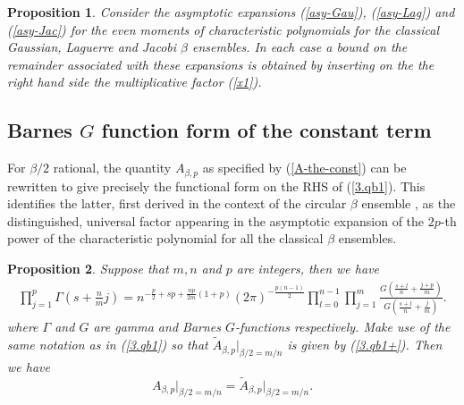\documentclass[11pt,a4paper]{article}
\numberwithin{equation}{section} %
\theoremstyle{plain}
\newtheorem{prop}{Proposition}
\theoremstyle{definition}
\numberwithin{prop}{section}
\numberwithin{cor}{section}
\numberwithin{remark}{section}
\begin{document}
\begin{prop}\label{P2.1}
Consider the asymptotic expansions
(\ref{asy-Gau}), (\ref{asy-Lag}) and 
(\ref{asy-Jac}) for the even moments of characteristic polynomials for the classical Gaussian, Laguerre and Jacobi 
$\beta$ ensembles. In each case a bound on the remainder associated with these expansions is obtained by inserting on the the right hand side the multiplicative factor (\ref{x1}).

\end{prop}



\subsection{Barnes $G$ function form of the constant term}
For $\beta/2$ rational, the quantity $A_{\beta,p}$ as specified by (\ref{A-the-const}) can be
rewritten to give precisely the functional form on the RHS of (\ref{3.qb1}). This
identifies the latter, first derived in the context of the circular $\beta$ ensemble
\cite{Fo92j}, as the distinguished, universal factor appearing in the asymptotic expansion of
the $2p$-th power of the characteristic polynomial for all the classical $\beta$ ensembles.


\begin{prop}\label{G-gam-eq}
    Suppose that $m,n$ and $p$ are integers, then we have
\begin{align}\label{1.18}
    \prod_{j=1}^{p}\Gamma\left(s+\frac{n}{m}j\right)=n^{-\frac{p}{2}+sp+\frac{np}{2m}(1+p)}(2\pi)^{-\frac{p(n-1)}{2}}\prod_{l=0}^{n-1}\prod_{j=1}^{m}\frac{G\left(\frac{s+l}{n}+\frac{j+p}{m}\right)}{G\left(\frac{s+l}{n}+\frac{j}{m}\right)}.
\end{align}
where $\Gamma$ and $G$ are gamma and Barnes $G$-functions respectively. Make use of the same notation as in (\ref{3.qb1}) so that  $\tilde{A}_{\beta,p} |_{\beta/2=m/n}$ is given by (\ref{3.qb1+}). Then we have
\begin{equation}\label{1.18a}
A_{\beta,p} \Big |_{\beta/2=m/n} = \tilde{A}_{\beta,p} \Big |_{\beta/2=m/n}.
\end{equation}
\end{prop}
\end{document}
